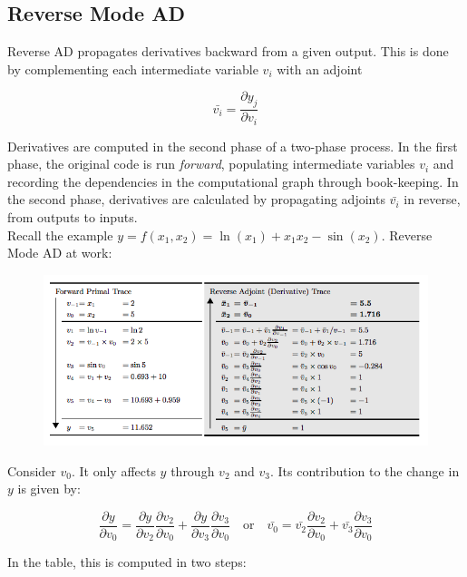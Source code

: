 \documentclass[11pt]{article}
\theoremstyle{definition}
\theoremstyle{plain}
\begin{document}
\newpage

\subsection{Reverse Mode AD}

\noindent Reverse AD propagates derivatives backward from a given output. This
is done by complementing each intermediate variable $v_i$ with an adjoint

$$ \bar{v_i} = \frac{\partial y_j}{\partial v_i} $$

\noindent Derivatives are computed in the second phase of a two-phase process.
In the first phase, the original code is run \textit{forward}, populating intermediate
variables $v_i$ and recording the dependencies in the computational graph through
book-keeping. In the second phase, derivatives are calculated by propagating adjoints
$\bar{v_i}$ in reverse, from outputs to inputs.\\

\noindent Recall the example $y = f(x_1,x_2) = \ln(x_1) + x_1 x_2 - \sin(x_2)$.
Reverse Mode AD at work:
\begin{figure}[H]
\includegraphics[width=14cm]{reverse}
\centering
\end{figure}

\noindent Consider $v_0$. It only affects $y$ through $v_2$ and $v_3$. Its
contribution to the change in $y$ is given by:

$$ \frac{\partial y}{\partial v_0} = \frac{\partial y}{\partial v_2} 
                                     \frac{\partial v_2}{\partial v_0} 
                                    +
                                     \frac{\partial y}{\partial v_3}
                                     \frac{\partial v_3}{\partial v_0}
\quad \text{or} \quad
\bar{v_0} = \bar{v_2} \frac{\partial v_2}{\partial v_0} 
             + \bar{v_3} \frac{\partial v_3}{\partial v_0} $$

\noindent In the table, this is computed in two steps:
\end{document}
